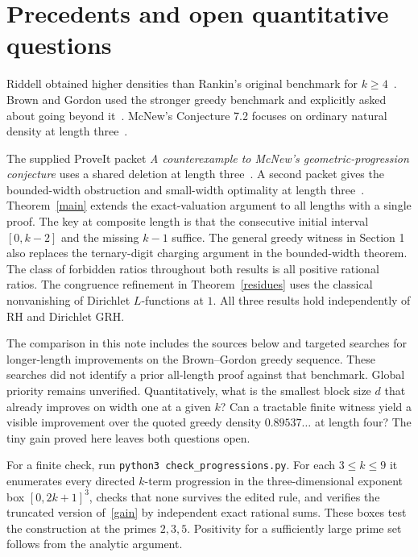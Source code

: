 \documentclass[11pt]{article}
\begin{document}
\section{Precedents and open quantitative questions}

Riddell obtained higher densities than Rankin's original benchmark for $k\ge4$~\cite{riddell}. Brown and Gordon used the stronger greedy benchmark and explicitly asked about going beyond it~\cite{BG}. McNew's Conjecture 7.2 focuses on ordinary natural density at length three~\cite{mcnew}.

The supplied ProveIt packet \emph{A counterexample to McNew's geometric-progression conjecture} uses a shared deletion at length three~\cite{pro}. A second packet gives the bounded-width obstruction and small-width optimality at length three~\cite{blocks}. Theorem~\ref{main} extends the exact-valuation argument to all lengths with a single proof. The key at composite length is that the consecutive initial interval $[0,k-2]$ and the missing $k-1$ suffice. The general greedy witness in Section 1 also replaces the ternary-digit charging argument in the bounded-width theorem. The class of forbidden ratios throughout both results is all positive rational ratios. The congruence refinement in Theorem~\ref{residues} uses the classical nonvanishing of Dirichlet $L$-functions at $1$. All three results hold independently of RH and Dirichlet GRH.

The comparison in this note includes the sources below and targeted searches for longer-length improvements on the Brown--Gordon greedy sequence. These searches did not identify a prior all-length proof against that benchmark. Global priority remains unverified. Quantitatively, what is the smallest block size $d$ that already improves on width one at a given $k$? Can a tractable finite witness yield a visible improvement over the quoted greedy density $0.89537\ldots$ at length four? The tiny gain proved here leaves both questions open.

For a finite check, run \texttt{python3 check\_progressions.py}. For each $3\le k\le9$ it enumerates every directed $k$-term progression in the three-dimensional exponent box $[0,2k+1]^3$, checks that none survives the edited rule, and verifies the truncated version of~\eqref{gain} by independent exact rational sums. These boxes test the construction at the primes $2,3,5$. Positivity for a sufficiently large prime set follows from the analytic argument.
\end{document}
